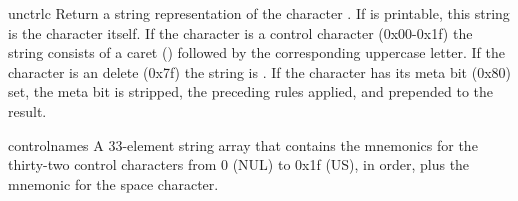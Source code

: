 \begin{funcdesc}{unctrl}{c}
Return a string representation of the \ASCII{} character .  If
 is printable, this string is the character itself.  If the
character is a control character (0x00-0x1f) the string consists of a
caret (\character{\^}) followed by the corresponding uppercase letter.
If the character is an \ASCII{} delete (0x7f) the string is
.  If the character has its meta bit (0x80) set, the meta
bit is stripped, the preceding rules applied, and
\character{!} prepended to the result.
\end{funcdesc}

\begin{datadesc}{controlnames}
A 33-element string array that contains the \ASCII{} mnemonics for the
thirty-two \ASCII{} control characters from 0 (NUL) to 0x1f (US), in
order, plus the mnemonic  for the space character.
\end{datadesc}
